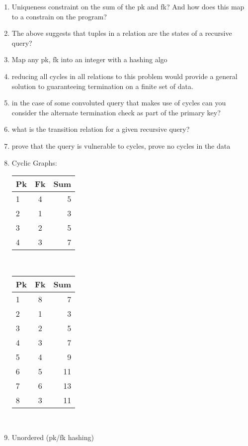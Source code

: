 \documentclass[12pt]{article}
\begin{document}
\begin{enumerate}
  \item Uniqueness constraint on the sum of the pk and fk? And how does this map to a constrain on the program?
  \item The above suggests that tuples in a relation are the states of a recursive query?
  \item Map any pk, fk into an integer with a hashing algo
  \item reducing all cycles in all relations to this problem would provide a general solution to guaranteeing termination on a finite set of data.
  \item in the case of some convoluted query that makes use of cycles can you consider the alternate termination check as part of the primary key?
  \item what is the transition relation for a given recursive query?
  \item prove that the query is vulnerable to cycles, prove no cycles in the data
  \item Cyclic Graphs: \\
    \begin{tabular}{| l | c || r |}
      \hline
      Pk & Fk & Sum \\
      \hline
      1 & 4 & 5 \\
      2 & 1 & 3 \\
      3 & 2 & 5 \\
      4 & 3 & 7 \\
      \hline
    \end{tabular} \\

    \begin{tabular}{| l | c || r |}
      \hline
      Pk & Fk & Sum \\
      \hline
      1 & 8 & 7 \\
      2 & 1 & 3 \\
      3 & 2 & 5 \\
      4 & 3 & 7 \\
      5 & 4 & 9 \\
      6 & 5 & 11 \\
      7 & 6 & 13 \\
      8 & 3 & 11 \\
      \hline
    \end{tabular} \\
  \item Unordered (pk/fk hashing) \\ \\


\end{enumerate}
\end{document}
